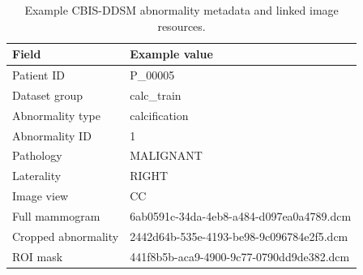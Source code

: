 \begin{table}[H]
\centering
\caption{Example CBIS-DDSM abnormality metadata and linked image resources.}
\label{tab:cbis_example_metadata}
\small
\begin{tabularx}{\textwidth}{@{}lX@{}}
\toprule
\textbf{Field} & \textbf{Example value} \\
\midrule
Patient ID & P\_00005 \\
Dataset group & calc\_train \\
Abnormality type & calcification \\
Abnormality ID & 1 \\
Pathology & MALIGNANT \\
Laterality & RIGHT \\
Image view & CC \\
Full mammogram & 6ab0591c-34da-4eb8-a484-d097ea0a4789.dcm \\
Cropped abnormality & 2442d64b-535e-4193-be98-9c096784e2f5.dcm \\
ROI mask & 441f8b5b-aca9-4900-9c77-0790dd9de382.dcm \\
\bottomrule
\end{tabularx}
\end{table}
